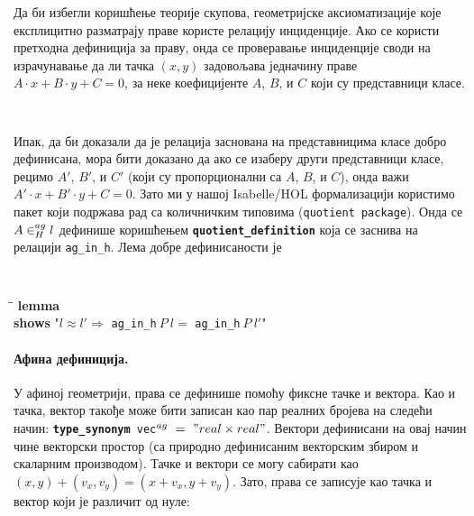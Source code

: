 Да би избегли коришћење теорије скупова, геометријске аксиоматизације
које експлицитно разматрају праве користе релацију инциденције. Ако се
користи претходна дефиниција за праву, онда се проверавање инциденције
своди на израчунавање да ли тачка $(x, y)$ задовољава једначину праве
$A\cdot x + B\cdot y + C = 0$, за неке коефицијенте $A$, $B$, и $C$
који су представници класе.
{\tt
\begin{tabbing}
\hspace{5mm}\=\hspace{5mm}\=\kill
\textbf{definition} "ag\_in\_h\ $(x, y)\ l \longleftrightarrow$}\\
\>$(\exists\ A\ B\ C.\ \RepRt{l} = (A,\ B,\ C) \,\wedge\,  (A\cdot x + B\cdot y + C = 0))$"}
\end{tabbing}
}

Ипак, да би доказали да је релација заснована на представницима класе
добро дефинисана, мора бити доказано да ако се изаберу други
представници класе, рецимо $A'$, $B'$, и $C'$ (који су пропорционални
са $A$, $B$, и $C$), онда важи $A'\cdot x + B'\cdot y + C = 0$. Зато
ми у нашој Isabelle/HOL формализацији користимо пакет који подржава
рад са количничким типовима ({\tt quotient package}). Онда се
$A \in^{ag}_H l$ дефинише коришћењем {\tt \textbf{quotient\_definition}}
која се заснива на релацији {\tt ag\_in\_h}. Лема добре дефинисаности
је
 {\tt
\begin{tabbing}
\hspace{5mm}\=\hspace{5mm}\=\kill
\textbf{lemma} \\
\>\textbf{shows} "$l \approx l' \Longrightarrow$ {\tt ag\_in\_h}$\ P\ l =$ {\tt ag\_in\_h}$\ P\ l'$"
\end{tabbing}
}


\paragraph{Афина дефиниција.}
У афиној геометрији, права се дефинише помоћу фиксне тачке и
вектора. Као и тачка, вектор такође може бити записан као пар реалних
бројева на следећи начин: {\tt \textbf{type\_synonym}\ vec$^{ag}\ =\ "real
  \times real"$}. Вектори дефинисани на овај начин чине векторски
простор (са природно дефинисаним векторским збиром и скаларним
производом). Тачке и вектори се могу сабирати као $(x, y) + (v_x, v_y)
= (x + v_x, y + v_y)$. Зато, права се записује као тачка и вектор који
је различит од нуле:
{\tt
\begin{tabbing}
\textbf{typedef} line\_point\_vec$^{ag} =$"${(p::$point$^{ag}, v::$vec$^{ag}).\ v \neq (0, 0)\}$"
\end{tabbing}
}

